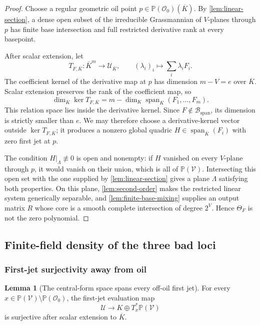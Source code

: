 \documentclass[11pt,a4paper]{article}
\theoremstyle{definition}
\newtheorem{lemma}[theorem]{Lemma}
\theoremstyle{remark}
\newcommand{\PP}{\mathbb P}
\newcommand{\cO}{\mathcal O}
\newcommand{\cB}{\mathcal B}
\newcommand{\cU}{\mathcal U}
\newcommand{\cV}{\mathcal V}
\newcommand{\Span}{\operatorname{span}}
\newcommand{\spanbad}{\mathrm{span}}
\begin{document}
\begin{proof}
Choose a regular geometric oil point $p\in\PP(\cO_0)(\overline K)$.  By \cref{lem:linear-section}, a dense open subset of the irreducible Grassmannian of $V$-planes through $p$ has finite base intersection and full restricted derivative rank at every basepoint.

After scalar extension, let
\[
T_{F,\overline K}:\overline K^m\longrightarrow\cU_{\overline K},\qquad
(\lambda_i)_i\longmapsto\sum_i\lambda_iF_i.
\]
The coefficient kernel of the derivative map at $p$ has dimension $m-V=e$ over $\overline K$.  Scalar extension preserves the rank of the coefficient map, so
\[
\dim_{\overline K}\ker T_{F,\overline K}
=m-\dim_K\Span_K(F_1,\ldots,F_m).
\]
This relation space lies inside the derivative kernel.  Since $F\notin\cB_{\spanbad}$, its dimension is strictly smaller than $e$.  We may therefore choose a derivative-kernel vector outside $\ker T_{F,\overline K}$; it produces a nonzero global quadric $H\in\Span_{\overline K}(F_i)$ with zero first jet at $p$.

The condition $H|_\Lambda\not\equiv0$ is open and nonempty: if $H$ vanished on every $V$-plane through $p$, it would vanish on their union, which is all of $\PP(\cV)$.  Intersecting this open set with the one supplied by \cref{lem:linear-section} gives a plane $\Lambda$ satisfying both properties.  On this plane, \cref{lem:second-order} makes the restricted linear system generically separable, and \cref{lem:finite-base-mixing} supplies an output matrix $R$ whose core is a smooth complete intersection of degree $2^V$.  Hence $\Theta_F$ is not the zero polynomial.
\end{proof}

\subsection{Finite-field density of the three bad loci}

\subsubsection{First-jet surjectivity away from oil}

\begin{lemma}[The central-form space spans every off-oil first jet]\label{lem:jet-surj}
For every $x\in\PP(\cV)\setminus\PP(\cO_0)$, the first-jet evaluation map
\[
\cU\longrightarrow K\oplus T_x^*\PP(\cV)
\]
is surjective after scalar extension to $\overline K$.
\end{lemma}
\end{document}
